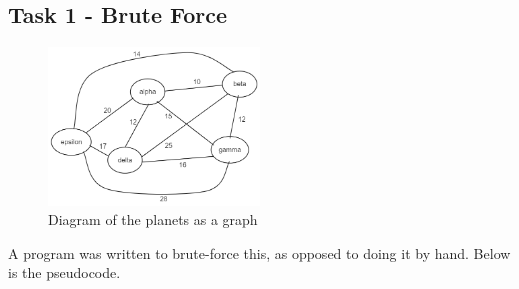 \documentclass[
]{article}
\author{}
\date{}
\begin{document}
\subsection{Task 1 - Brute Force}\label{task-1---brute-force}

\begin{figure}
\centering
\includegraphics[width=0.5\textwidth,height=\textheight]{diagrams/Assignment planets diagram.png}
\caption{Diagram of the planets as a graph}
\end{figure}

A program was written to brute-force this, as opposed to doing it by
hand. Below is the pseudocode.
\end{document}
